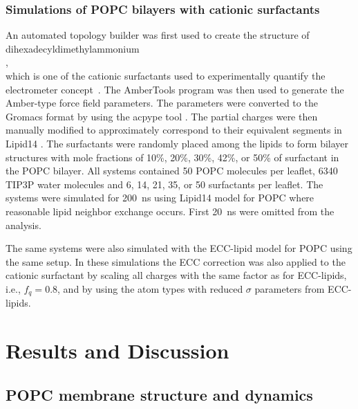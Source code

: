\documentclass[aip,jcp,twocolumn]{revtex4}
\begin{document}
\subsubsection{Simulations of POPC bilayers with cationic surfactants}
An automated topology builder \cite{malde11} was first used to create the structure of
dihexadecyldimethylammonium \\[0.5cm]
 , 
\vspace{0.5cm} \\
which is one of the cationic surfactants used to experimentally quantify the electrometer concept~\cite{scherer89}.
The AmberTools program \cite{amber} was then used to generate the Amber-type force field
parameters. The parameters were converted to the Gromacs format by using
the acpype tool \cite{acpype}. The partial charges were then manually modified
to approximately correspond to their equivalent segments in Lipid14 \cite{dickson14}.
The surfactants were randomly placed among the lipids to form bilayer structures with
mole fractions of 10\%, 20\%, 30\%, 42\%, or 50\% of surfactant in the POPC bilayer.
All systems contained 50 POPC molecules per leaflet, 6340 TIP3P water molecules and
6, 14, 21, 35, or 50 surfactants per leaflet. 
The systems were simulated for 200~ns using Lipid14 model for POPC where reasonable lipid neighbor exchange occurs.
First 20~ns were omitted from the analysis. 

The same systems were also simulated with the ECC-lipid model for POPC using the same setup. 
In these simulations the ECC correction was also applied to the cationic surfactant 
by scaling all charges with the same factor as for ECC-lipids, i.e., $f_q=0.8$, 
and by using the atom types with reduced $\sigma$ parameters from ECC-lipids. 


\section{Results and Discussion}

\subsection{POPC membrane structure and dynamics}
\end{document}
